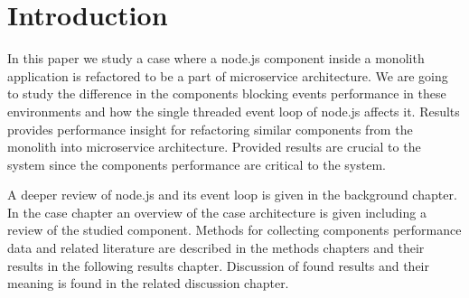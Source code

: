 \chapter{Introduction\label{intro}}
In this paper we study a case where a node.js component inside a monolith application is refactored to be a part of microservice architecture.
We are going to study the difference in the components blocking events performance in these environments and how the single threaded event loop of node.js affects it.
Results provides performance insight for refactoring similar components from the monolith into microservice architecture.
Provided results are crucial to the system since the components performance are critical to the system.

A deeper review of node.js and its event loop is given in the background chapter.
In the case chapter an overview of the case architecture is given including a review of the studied component.
Methods for collecting components performance data and related literature are described in the methods chapters and their results in the following results chapter.
Discussion of found results and their meaning is found in the related discussion chapter.

